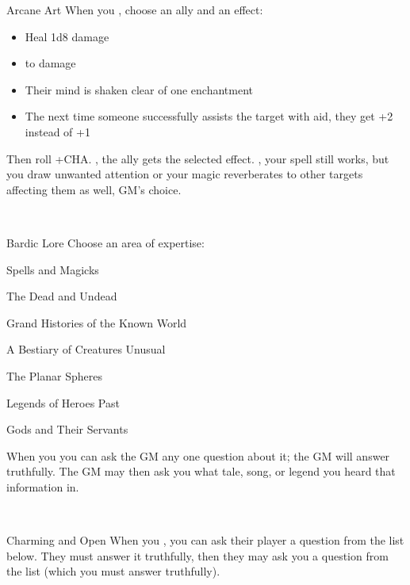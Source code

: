 \documentclass[8pt]{extarticle}
\begin{document}
\begin{minipage}[t]{4.6in}


\begin{basicmove}{Arcane Art}
  When you , choose
  an ally and an effect:

  \begin{itemize}
  \item Heal 1d8 damage
  \item {} to damage
  \item Their mind is shaken clear of one enchantment
  \item The next time someone successfully assists the target with
    aid, they get +2 instead of +1
  \end{itemize}

  Then roll +CHA. \onSuccess, the ally gets the selected
  effect. \onPartial, your spell still works, but you draw unwanted
  attention or your magic reverberates to other targets affecting them
  as well, GM’s choice.
\end{basicmove}
\

\begin{basicmove}{Bardic Lore}
  Choose an area of expertise:

  \begin{choices}
  \item Spells and Magicks
  \item The Dead and Undead
  \item Grand Histories of the Known World
  \item A Bestiary of Creatures Unusual
  \item The Planar Spheres
  \item Legends of Heroes Past
  \item Gods and Their Servants
  \end{choices}

  When you  you can ask the
  GM any one question about it; the GM will answer truthfully. The GM
  may then ask you what tale, song, or legend you heard that
  information in.
\end{basicmove}
\

\begin{basicmove}{Charming and Open}
  When you , you can ask their
  player a question from the list below. They must answer it
  truthfully, then they may ask you a question from the list (which
  you must answer truthfully).


\end{basicmove}
\end{minipage}
\end{document}
